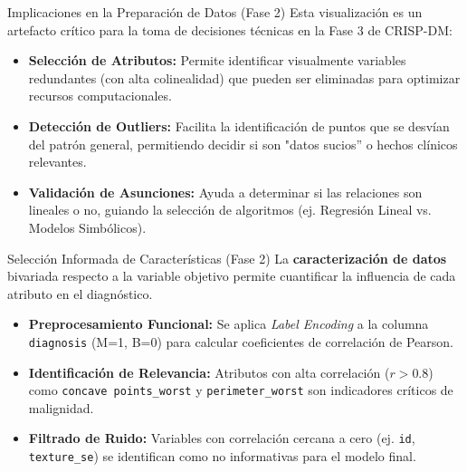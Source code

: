 \documentclass{beamer}
\begin{document}
	\begin{frame}{Implicaciones en la Preparación de Datos (Fase 2)}
		Esta visualización es un artefacto crítico para la toma de decisiones técnicas en la Fase 3 de CRISP-DM:
		
		\begin{itemize}
			\item<2-> \textbf{Selección de Atributos:} Permite identificar visualmente variables redundantes (con alta colinealidad) que pueden ser eliminadas para optimizar recursos computacionales.
			\item<3-> \textbf{Detección de Outliers:} Facilita la identificación de puntos que se desvían del patrón general, permitiendo decidir si son "datos sucios'' o hechos clínicos relevantes.
			\item<4-> \textbf{Validación de Asunciones:} Ayuda a determinar si las relaciones son lineales o no, guiando la selección de algoritmos (ej. Regresión Lineal vs. Modelos Simbólicos).
		\end{itemize}
	\end{frame}
	
	\begin{frame}{Selección Informada de Características (Fase 2)}
		La \textbf{caracterización de datos} bivariada respecto a la variable objetivo permite cuantificar la influencia de cada atributo en el diagnóstico.
		
		\begin{itemize}
			\item<2-> \textbf{Preprocesamiento Funcional:} Se aplica \textit{Label Encoding} a la columna \texttt{diagnosis} (M=1, B=0) para calcular coeficientes de correlación de Pearson.
			\item<3-> \textbf{Identificación de Relevancia:} Atributos con alta correlación ($r > 0.8$) como \texttt{concave points\_worst} y \texttt{perimeter\_worst} son indicadores críticos de malignidad.
			\item<4-> \textbf{Filtrado de Ruido:} Variables con correlación cercana a cero (ej. \texttt{id}, \texttt{texture\_se}) se identifican como no informativas para el modelo final.
		\end{itemize}
	\end{frame}
	
\end{document}
